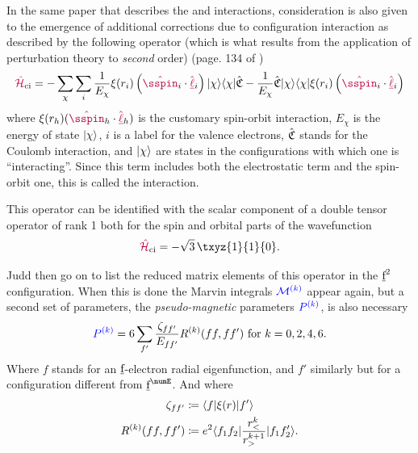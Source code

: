 \documentclass[11pt, twoside,openright]{article}
\begin{document}
    In the same paper \cite{judd_intra-atomic_1968} that describes the \spinspin and \soo interactions, consideration is also given to the emergence of additional corrections due to configuration interaction as described by the following operator (which is what results from the application of perturbation theory to \textit{second} order) (page.  134 of \cite{judd_intra-atomic_1968})
    \begin{equation}
        \ham_{\text{ci}} = -\sum_\chi \sum_i \frac{1}{E_\chi}\xi(r_i) 
            \left(  
                \op{\sspin}_i\cdot\op{\lorb}_i
            \right) \ket{\chi} \bra{\chi} \CoulombNonCentral
            - \frac{1}{E_\chi}\CoulombNonCentral \ket{\chi}\bra{\chi} \xi(r_i) 
                \left( 
                    \op{\sspin}_i\cdot\op{\lorb}_i
                \right) 
    \end{equation} 
    where $\xi(r_h) (\op{\sspin}_h\cdot\op{\lorb}_h)$ is the customary spin-orbit interaction, $E_\chi$ is the energy of state $|\chi\rangle$, $i$ is a label for the valence electrons, $\hat{\mathfrak{C}}$ stands for the Coulomb interaction, and $|\chi\rangle$ are states in the configurations with which one is ``interacting''. Since this term includes both the electrostatic term and the spin-orbit one, this is called the \ecso interaction.

    This operator can be identified with the scalar component of a double tensor operator of rank 1 both for the spin and orbital parts of the wavefunction
    \begin{equation}
        \ham_{\text{ci}} = - \sqrt{3}\,\txyz{1}{1}{0}.
    \end{equation}

    Judd \etal \cite{judd_intra-atomic_1968} then go on to list the reduced matrix elements of this operator in the $\underbar{\text{f}}^2$ configuration. When this is done the Marvin integrals $\textcolor{blue}{\mathcal{M}^{(k)}}$ appear again, but a second set of parameters, the \textit{pseudo-magnetic} parameters $\textcolor{blue}{P^{(k)}}$, is also necessary    
    \begin{equation}
        \textcolor{blue}{P^{(k)}} = 6 \sum_{f'}
            \frac{\zeta_{ff'}}
                {E_{ff'}}
                R^{(k)}(ff,ff') \text{ for }k=0,2,4,6.
    \end{equation}
    Where $f$ stands for an $\underbar{\text{f}}$-electron radial eigenfunction, and $f'$ similarly but for a configuration different from $\forb^\numE$. And where
    \begin{align}
        \zeta_{ff'} &\coloneqq \langle f|\xi(r)|f'\rangle \\
        R^{(k)}(ff,ff') &\coloneqq e^2 \langle f_1f_2|\frac{r_<^k}{r_>^{k+1}}|f_1f_2'\rangle.
    \end{align}
    
\end{document}
